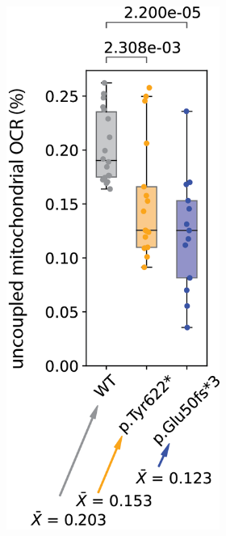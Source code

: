 \begin{figure}[ht]
\begin{subfigure}[t]{.75\textwidth}
\begin{subfigure}[t]{.25\textwidth}
            \includegraphics[width=\textwidth]{./main_plots/uncoupling.png}        

\end{subfigure}
\end{subfigure}
\end{figure}
